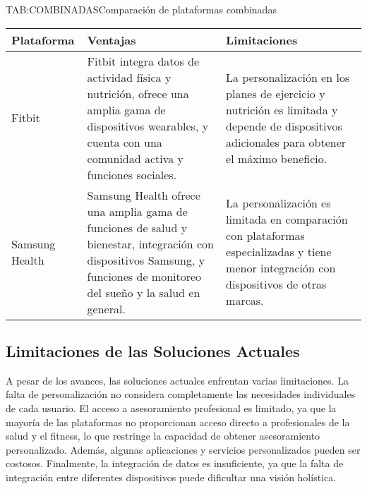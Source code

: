 \begin{table}[Comparación de plataformas combinadas]{TAB:COMBINADAS}{Comparación de plataformas combinadas}
  \begin{tabular}{|p{3cm}|p{5cm}|p{5cm}|}
    \hline
    \textbf{Plataforma} & \textbf{Ventajas} & \textbf{Limitaciones} \\
    \hline
    Fitbit & Fitbit integra datos de actividad física y nutrición, ofrece una amplia gama de dispositivos wearables, y cuenta con una comunidad activa y funciones sociales. & La personalización en los planes de ejercicio y nutrición es limitada y depende de dispositivos adicionales para obtener el máximo beneficio. \\
    \hline
    Samsung Health & Samsung Health ofrece una amplia gama de funciones de salud y bienestar, integración con dispositivos Samsung, y funciones de monitoreo del sueño y la salud en general. & La personalización es limitada en comparación con plataformas especializadas y tiene menor integración con dispositivos de otras marcas. \\
    \hline
  \end{tabular}
\end{table}

\subsection{Limitaciones de las Soluciones Actuales}

A pesar de los avances, las soluciones actuales enfrentan varias limitaciones. La falta de personalización no considera completamente las necesidades individuales de cada usuario. El acceso a asesoramiento profesional es limitado, ya que la mayoría de las plataformas no proporcionan acceso directo a profesionales de la salud y el fitness, lo que restringe la capacidad de obtener asesoramiento personalizado. Además, algunas aplicaciones y servicios personalizados pueden ser costosos. Finalmente, la integración de datos es insuficiente, ya que la falta de integración entre diferentes dispositivos puede dificultar una visión holística.

\newpage